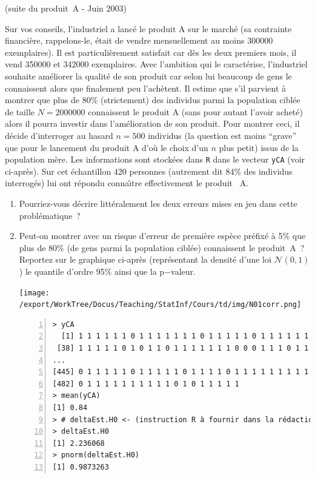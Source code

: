 \documentclass[10pt]{report}
\begin{document}
\begin{exercice} (suite du produit~A - Juin 2003)

Sur vos conseils, l'industriel a lanc{\'e} le produit A sur le march{\'e} (sa contrainte financi{\`e}re, rappelons-le, {\'e}tait de vendre mensuellement au moins 300000 exemplaires). Il est particuli{\`e}rement satisfait car d{\`e}s les deux premiers mois, il vend 350000 et 342000 exemplaires. Avec l'ambition qui le caract{\'e}rise, l'industriel souhaite am{\'e}liorer la qualit{\'e} de son produit car selon lui beaucoup de gens le connaissent alors que finalement peu l'ach{\`e}tent. Il estime que s'il parvient {\`a} montrer que plus de $80\%$ (strictement) des individus parmi la population cibl{\'e}e de taille $N=2000000$ connaissent le produit A (sans pour autant l'avoir achet{\'e}) alors il pourra investir dans l'am{\'e}lioration de son produit. Pour montrer ceci, il d{\'e}cide d'interroger au hasard $n=500$ individus (la question est moins ``grave'' que pour le lancement du produit A d'o{\`u} le choix d'un $n$ plus petit) issus de la population m{\`e}re. Les informations sont stock{\'e}es dans \texttt{R} dans le vecteur \texttt{yCA} (voir ci-apr{\`e}s). Sur cet {\'e}chantillon 420 personnes (autrement dit 84\% des individus interrog{\'e}s) lui ont r{\'e}pondu conna{\^\i}tre effectivement le produit~ A. \\
\begin{enumerate}
\item Pourriez-vous d{\'e}crire litt{\'e}ralement les deux erreurs mises en jeu dans cette probl{\'e}matique~? 



\item Peut-on montrer avec un risque d'erreur de premi{\`e}re esp{\`e}ce pr{\'e}fix{\'e} {\`a} 5\% que plus de 80\% (de gens parmi la population cibl{\'e}e) connaissent le produit~A~? Reportez sur le graphique ci-apr{\`e}s (repr{\'e}sentant la densit{\'e} d'une loi $\mathcal{N}(0,1)$) le quantile d'ordre 95\% ainsi que la p$-$valeur. 
 

\begin{center} 
\texttt{[image: /export/WorkTree/Docus/Teaching/StatInf/Cours/td/img/N01corr.png]}
\end{center}

\IndicR
\begin{Verbatim}[frame=leftline,fontfamily=tt,fontshape=n,numbers=left]
> yCA
  [1] 1 1 1 1 1 1 0 1 1 1 1 1 1 1 0 1 1 1 1 1 0 1 1 1 1 1 1 1 1 1 1 0 1 1 1 1 1
 [38] 1 1 1 1 1 0 1 0 1 1 0 1 1 1 1 1 1 1 0 0 0 1 1 1 0 1 1 1 1 1 1 1 0 1 1 1 1
...
[445] 0 1 1 1 1 1 0 1 1 1 1 1 0 1 1 1 1 0 1 1 1 1 1 1 1 1 1 1 1 1 1 1 1 1 1 1 1
[482] 0 1 1 1 1 1 1 1 1 1 1 0 1 0 1 1 1 1 1
> mean(yCA)
[1] 0.84
> # deltaEst.H0 <- (instruction R à fournir dans la rédaction)
> deltaEst.H0
[1] 2.236068
> pnorm(deltaEst.H0)
[1] 0.9873263
\end{Verbatim}




\end{enumerate}
\end{exercice}
\end{document}
